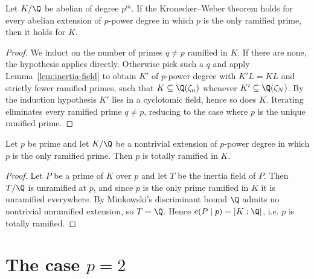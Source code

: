 \begin{lemma}
  \label{lem:reduction-single-prime}
  \leanok
  Let $K/\Q$ be abelian of degree $p^m$. If the Kronecker--Weber theorem holds
  for every abelian extension of $p$-power degree in which $p$ is the only
  ramified prime, then it holds for $K$.
\end{lemma}
\begin{proof}
  We induct on the number of primes $q \neq p$ ramified in $K$. If there are
  none, the hypothesis applies directly. Otherwise pick such a $q$ and apply
  Lemma~\ref{lem:inertia-field} to obtain $K'$ of $p$-power degree with $K'L =
  KL$ and strictly fewer ramified primes, such that $K \subseteq \Q(\zeta_n)$
  whenever $K' \subseteq \Q(\zeta_N)$. By the induction hypothesis $K'$ lies in
  a cyclotomic field, hence so does $K$. Iterating eliminates every ramified
  prime $q \neq p$, reducing to the case where $p$ is the unique ramified prime.
\end{proof}

\begin{lemma}
  \label{lem:p-totally-ramified}
  Let $p$ be prime and let $K/\Q$ be a nontrivial extension of $p$-power degree
  in which $p$ is the only ramified prime. Then $p$ is totally ramified in $K$.
\end{lemma}
\begin{proof}
  Let $P$ be a prime of $K$ over $p$ and let $T$ be the inertia field of $P$.
  Then $T/\Q$ is unramified at $p$, and since $p$ is the only prime ramified in
  $K$ it is unramified everywhere. By Minkowski's discriminant bound $\Q$ admits
  no nontrivial unramified extension, so $T = \Q$. Hence
  $e(P \mid p) = [K : \Q]$, i.e. $p$ is totally ramified.
\end{proof}

\section{The case \texorpdfstring{$p = 2$}{p = 2}}

